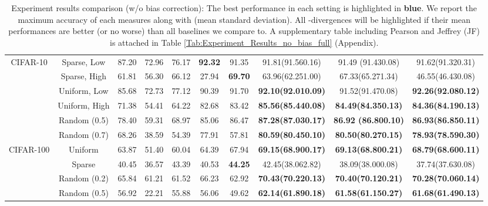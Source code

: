 \begin{table*}[!ht]
\begin{threeparttable}
\begin{tabular}{c|c|c|c|c|c|c|c|c|c}
\multirow{5}{*}{CIFAR-10}             
& Sparse, Low   & 87.20    & 72.96    & 76.17   & {\color{blue}\textbf{92.32}}  &   91.35   &  91.81(91.560.16) & 91.49 (91.430.08)  &   91.62(91.320.31) \\ \cline{2-10} 
& Sparse, High  & 61.81  & 56.30    & 66.12   & 27.94 & {\color{blue} \textbf{69.70}}        & 63.96(62.251.00) & 67.33(65.271.34) & 46.55(46.430.08)  \\\cline{2-10}
& Uniform, Low  & 85.68 & 72.73 & 77.12 & 90.39 & 91.70 & {\color{blue}\textbf{92.10(92.010.09)}} & 91.52(91.470.08) & {\color{blue}\textbf{92.26(92.080.12)}}   \\ \cline{2-10} 
& Uniform, High & 71.38  & 54.41 & 64.22 & 82.68 & 83.42 & {\color{blue}\textbf{85.56(85.440.08)}}  & {\color{blue}\textbf{84.49(84.350.13)}} &  {\color{blue}\textbf{84.36(84.190.13)}}  \\ \cline{2-10}  
& Random (0.5) & 78.40 & 59.31 & 68.97 & 85.06 & 86.47  & {\color{blue}\textbf{87.28(87.030.17)}} & {\color{blue}\textbf{86.92 (86.800.10)}}  &   {\color{blue}\textbf{86.93(86.850.11)}}  \\ 
\cline{2-10}  
& Random (0.7) & 68.26 & 38.59  &  54.39 &  77.91  & 57.81 &  {\color{blue}\textbf{80.59(80.450.10)}} & {\color{blue}\textbf{80.50(80.270.15)}} &  {\color{blue}\textbf{78.93(78.590.30)}}   \\ \hline\hline
\multirow{5}{*}{CIFAR-100}
& Uniform & 63.87 &  51.40& 60.04 & 64.39  & 67.94 & {\color{blue}\textbf{69.15(68.900.17)}} & {\color{blue}\textbf{69.13(68.800.21)}} &   {\color{blue}\textbf{68.79(68.600.11)}}\\ \cline{2-10}
& Sparse & 40.45  & 36.57 & 43.39 & 40.53  & {\color{blue}\textbf{44.25}} & 42.45(38.062.82) & 38.09(38.000.08) & 37.74(37.630.08) \\ \cline{2-10}
& Random (0.2) & 65.84  & 61.21 & 61.52 & 66.23  & 62.92 & {\color{blue}\textbf{70.43(70.220.13)}} & {\color{blue}\textbf{70.40(70.120.21)}} &  {\color{blue}\textbf{70.28(70.060.14)}}  \\ \cline{2-10}
& Random (0.5) & 56.92  & 22.21 & 55.88 & 56.06  & 49.62  & {\color{blue}\textbf{62.14(61.890.18)}} & {\color{blue}\textbf{61.58(61.150.27)}} &   {\color{blue}\textbf{61.68(61.490.13)}}  \\ \hline

\end{tabular}
\end{threeparttable}
\caption{Experiment results comparison (w/o bias correction): The best performance in each setting is highlighted in {\color{blue}\textbf{{blue}}}. \color{black}We report the maximum accuracy of each  measures along with (mean  standard deviation). All -divergences will be highlighted if their mean performances are better (or no worse) than all baselines we compare to. A supplementary table including Pearson  and Jeffrey (JF) is attached in Table \ref{Tab:Experiment_Results_no_bias_full} (Appendix).
}
\label{Tab:Experiment_Results_no_bias}
\end{table*}


